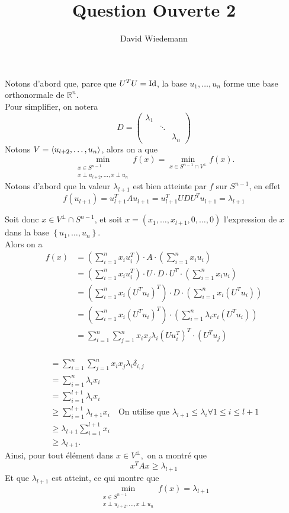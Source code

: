 \documentclass[11pt, a4paper]{article}
\begin{document}
\title{Question Ouverte 2}
\author{David Wiedemann}
\maketitle
Notons d'abord que, parce que $U^{T}U = \operatorname*{Id}$, la base  $u_1, \ldots, u_n$ forme une base orthonormale de $ \mathbb{R}^n$.\\
Pour simplifier, on notera
\[ 
D = \begin{pmatrix}
	\lambda_1 & & \\
		  & \ddots & \\
		  & & \lambda_n
\end{pmatrix} 
\]
Notons $V= \left\langle u_{l+2}, \ldots, u_{n}  \right\rangle $, alors on a que
\[ 
	\min _{ \substack { x \in S^{n-1}\\ x \perp u_{l +2}, \ldots, x \perp u_{n} } } f( x) = \min _{x \in S^{n-1}\cap V^{\perp}} f( x) .
\]
Notons d'abord que la valeur $\lambda_{l+1} $ est bien atteinte par $f$ sur $S^{n-1} $, en effet
\[ 
	f( u_{l+1} ) = u_{l+1}^{T} A u_{l+1}  = u_{l+1} ^{T} U D U^{T} u_{l+1} = \lambda_{l+1} 
\]

Soit donc $x \in V^{\perp} \cap S^{n-1}$, et soit $x = ( x_1, \ldots, x_{l+1} , 0 ,\ldots, 0) $ l'expression de $x$ dans la base $ \left\{ u_1, \ldots, u_n \right\} $.\\
Alors on a 
\begin{align*}
	f( x) &= \left( \sum_{i=1}^{ n} x_i u_i^{T}\right) \cdot A \cdot\left( \sum_{i=1}^{ n} x_i u_i\right) \\
	&= \left( \sum_{i=1}^{ n} x_i u_i^{T}\right)\cdot U\cdot D\cdot U ^{T}\cdot\left( \sum_{i=1}^{ n} x_i u_i\right)\\
	&= \left( \sum_{i=1}^{ n} x_i ( U ^{T}u_i)^{T} \right)\cdot D  \cdot\left( \sum_{i=1}^{ n} x_i ( U^{T}u_i )\right)\\
	&= \left( \sum_{i=1}^{ n} x_i ( U ^{T}u_i)^{T} \right) \cdot  \left( \sum_{i=1}^{ n}\lambda_i x_i ( U^{T}u_i )\right)\\
	&=  \sum_{i=1}^{ n}\sum_{j=1}^{ n} x_i x_j  \lambda_i  ( Uu_i^{T} )^{T}\cdot( U ^{T}u_j)\\
	\end{align*}
	
	\begin{align*}
	&=  \sum_{i=1}^{ n}\sum_{j=1}^{ n} x_i x_j  \lambda_i  \delta_{i,j} \\
	&= \sum_{i=1}^{ n}\lambda_i x_{i} \\
	&= \sum_{i=1}^{ l+1}\lambda_i x_i\\
	& \geq \sum_{i=1}^{ l+1}\lambda_{l+1} x_i\quad  \text {On utilise que $\lambda_{l+1} \leq  \lambda_i \forall 1 \leq  i \leq l+1 $ } \\
	& \geq  \lambda_{l+1} \sum_{i=1}^{ l+1}x_i\\
	& \geq \lambda_{l+1} .
\end{align*}
Ainsi, pour tout élément dans $x \in V^{\perp},$ on a montré que
\[ 
x^{T} A x \geq \lambda_{l+1} 
\]
Et que $\lambda_{l+1} $ est atteint, ce qui montre que
\[ 	\min _{ \substack { x \in S^{n-1}\\ x \perp u_{l +2}, \ldots, x \perp u_{n} } } f( x) = \lambda_{l+1} 	
\]
\end{document}
